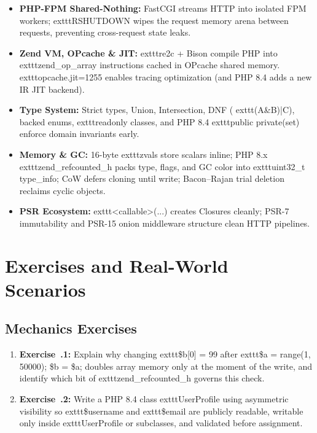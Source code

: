 \begin{itemize}[leftmargin=15pt]
  \item \textbf{PHP-FPM Shared-Nothing:} FastCGI streams HTTP into isolated FPM workers; 	exttt{RSHUTDOWN} wipes the request memory arena between requests, preventing cross-request state leaks.
  \item \textbf{Zend VM, OPcache \& JIT:} 	exttt{re2c} + Bison compile PHP into 	exttt{zend\_op\_array} instructions cached in OPcache shared memory. 	exttt{opcache.jit=1255} enables tracing optimization (and PHP 8.4 adds a new IR JIT backend).
  \item \textbf{Type System:} Strict types, Union, Intersection, DNF (	exttt{(A\&B)|C}), backed enums, 	exttt{readonly} classes, and PHP 8.4 	exttt{public private(set)} enforce domain invariants early.
  \item \textbf{Memory \& GC:} 16-byte 	exttt{zval}s store scalars inline; PHP 8.x 	exttt{zend\_refcounted\_h} packs type, flags, and GC color into 	exttt{uint32\_t type\_info}; CoW defers cloning until write; Bacon--Rajan trial deletion reclaims cyclic objects.
  \item \textbf{PSR Ecosystem:} 	exttt{<callable>(...)} creates Closures cleanly; PSR-7 immutability and PSR-15 onion middleware structure clean HTTP pipelines.
\end{itemize}

\section{Exercises and Real-World Scenarios}

\subsection{Mechanics Exercises}
\begin{enumerate}[leftmargin=15pt]
  \item \textbf{Exercise~\thechapter.1:} Explain why changing 	exttt{\$b[0] = 99} after 	exttt{\$a = range(1, 50000); \$b = \$a;} doubles array memory only at the moment of the write, and identify which bit of 	exttt{zend\_refcounted\_h} governs this check.
  \item \textbf{Exercise~\thechapter.2:} Write a PHP 8.4 class 	exttt{UserProfile} using asymmetric visibility so 	exttt{\$username} and 	exttt{\$email} are publicly readable, writable only inside 	exttt{UserProfile} or subclasses, and validated before assignment.
\end{enumerate}

